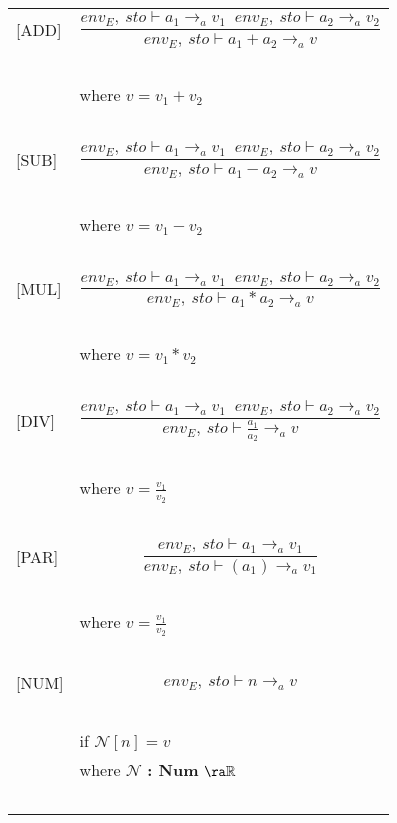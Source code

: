 \begin{table}
\begin{tabular}{l l}
[ADD] & \[\frac{env_E, \: sto \vdash a_1 \rightarrow_a v_1 \;\; env_E, \: sto \vdash a_2 \rightarrow_a v_2}{env_E, \: sto \vdash a_1 + a_2 \rightarrow_a v}\] \\
~ & ~ \\
~ & \indent\indent where $v=v_1+v_2$ \\
~ & ~ \\

[SUB] & \[\frac{env_E, \: sto \vdash a_1 \rightarrow_a v_1 \;\; env_E, \: sto \vdash a_2 \rightarrow_a v_2}{env_E, \: sto \vdash a_1 - a_2 \rightarrow_a v}\] \\
~ & ~ \\
~ & \indent\indent where $v=v_1-v_2$ \\ 
~ & ~ \\

[MUL] & \[\frac{env_E, \: sto \vdash a_1 \rightarrow_a v_1 \;\; env_E, \: sto \vdash a_2 \rightarrow_a v_2}{env_E, \: sto \vdash a_1 * a_2 \rightarrow_a v}\] \\
~ & ~ \\
~ & \indent\indent where $v=v_1 * v_2$ \\ 
~ & ~ \\

[DIV] & \[\frac{env_E,\: sto \vdash a_1 \rightarrow_a v_1 \;\; env_E,\: sto \vdash a_2 \rightarrow_a v_2}{env_E, \: sto \vdash \frac{a_1}{a_2} \rightarrow_a v}\] \\
~ & ~ \\
~ & \indent\indent where $v=\frac{v_1}{v_2}$ \\ 
~ & ~ \\

[PAR] & \[\frac{env_E, \: sto \vdash a_1 \rightarrow_a v_1}{env_E, \: sto \vdash (a_1) \rightarrow_a v_1}\] \\
~ & ~ \\
~ & \indent\indent where $v=\frac{v_1}{v_2}$ \\ 
~ & ~ \\

[NUM] & \[env_E, \: sto \vdash n \rightarrow_a v\] \\
~ & ~ \\
~ & \indent\indent if $\mathcal{N} [n]=v$ \\
~ & \indent\indent where $\mathcal{N}$ \textbf{: Num} $\ra \mathbb{R}$ \\
~ & ~ \\


\end{tabular}
\end{table}

